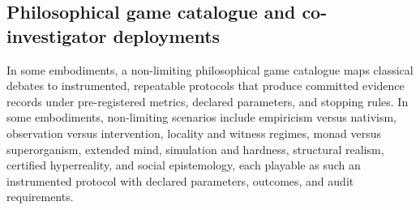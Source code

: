 \documentclass[a4paper,12pt]{article}
\begin{document}
\subsection{Philosophical game catalogue and co-investigator
  deployments}


In some embodiments, a non-limiting philosophical game catalogue maps
classical debates to instrumented, repeatable protocols that produce
committed evidence records under pre-registered metrics, declared
parameters, and stopping rules. In some embodiments, non-limiting
scenarios include empiricism versus nativism, observation versus
intervention, locality and witness regimes, monad versus
superorganism, extended mind, simulation and hardness, structural
realism, certified hyperreality, and social epistemology, each
playable as such an instrumented protocol with declared parameters,
outcomes, and audit requirements.
\end{document}

